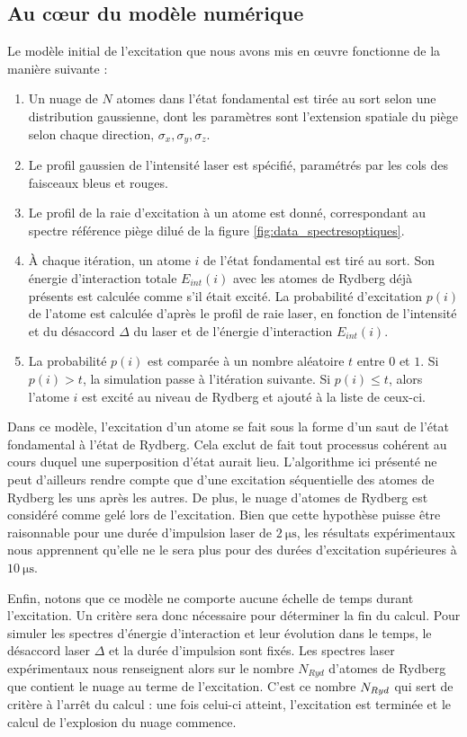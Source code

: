 	\subsection{Au c\oe ur du modèle numérique}\label{subsec:algo_1}
\noindent Le modèle initial de l'excitation que nous avons mis en \oe uvre fonctionne de la manière suivante :
\begin{enumerate}
	\item Un nuage de $N$ atomes dans l'état fondamental est tirée au sort selon une distribution gaussienne, dont les paramètres sont l'extension spatiale du piège selon chaque direction, $\sigma_x,\sigma_y,\sigma_z$.
	\item Le profil gaussien de l'intensité laser est spécifié, paramétrés par les cols des faisceaux bleus et rouges.
	\item Le profil de la raie d'excitation à un atome est donné, correspondant au spectre \og référence piège dilué \fg{} de la figure \eqref{fig:data_spectresoptiques}.
	\item \`A chaque itération, un atome $i$ de l'état fondamental est tiré au sort.
	Son énergie d'interaction totale $E_{int}(i)$ avec les atomes de Rydberg déjà présents est calculée comme s'il était excité.
	La probabilité d'excitation $p(i)$ de l'atome est calculée d'après le profil de raie laser, en fonction de l'intensité  et du désaccord $\Delta$ du laser et de l'énergie d'interaction $E_{int}(i)$.
	\item La probabilité $p(i)$ est comparée à un nombre aléatoire $t$ entre $0$ et $1$. Si $p(i)>t$, la simulation passe à l'itération suivante.
	Si $p(i)\leq t$, alors l'atome $i$ est excité au niveau de Rydberg et ajouté à la liste de ceux-ci.
\end{enumerate}
%
Dans ce modèle, l'excitation d'un atome se fait sous la forme d'un \og saut \fg{} de l'état fondamental à l'état de Rydberg.
Cela exclut de fait tout processus cohérent au cours duquel une superposition d'état aurait lieu.
L'algorithme ici présenté ne peut d'ailleurs rendre compte que d'une excitation séquentielle des atomes de Rydberg les uns après les autres.
De plus, le nuage d'atomes de Rydberg est considéré comme gelé lors de l'excitation.
Bien que cette hypothèse puisse être raisonnable pour une durée d'impulsion laser de $\SI{2}{\us}$, les résultats expérimentaux nous apprennent qu'elle ne le sera plus pour des durées d'excitation supérieures à $\SI{10}{\us}$.

Enfin, notons que ce modèle ne comporte aucune échelle de temps durant l'excitation.
Un critère sera donc nécessaire pour déterminer la fin du calcul.
Pour simuler les spectres d'énergie d'interaction et leur évolution dans le temps, le désaccord laser $\Delta$ et la durée d'impulsion sont fixés.
Les spectres laser expérimentaux nous renseignent alors sur le nombre $N_{Ryd}$ d'atomes de Rydberg que contient le nuage au terme de l'excitation.
C'est ce nombre $N_{Ryd}$ qui sert de critère à l'arrêt du calcul : une fois celui-ci atteint, l'excitation est terminée et le calcul de l'explosion du nuage commence.

